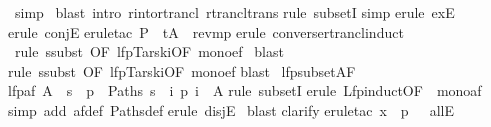\begin{isabellebody}
\ simp{\isacharparenright}\isanewline
\ blast\ intro{\isacharcolon}\ r{\isacharunderscore}into{\isacharunderscore}rtrancl\ rtrancl{\isacharunderscore}trans{\isacharparenright}\isanewline
{}rule\ subsetI{\isacharparenright}\isanewline
{}simp{\isacharparenright}\isanewline
{}erule\ exE{\isacharparenright}\isanewline
{}erule\ conjE{\isacharparenright}\isanewline
{}erule{\isacharunderscore}tac\ P\ {\isacharequal}\ {\isachardoublequote}t{\isasymin}A{\isachardoublequote}\ \ rev{\isacharunderscore}mp{\isacharparenright}\isanewline
{}erule\ converse{\isacharunderscore}rtrancl{\isacharunderscore}induct{\isacharparenright}\isanewline
\ rule\ ssubst\ {\isacharbrackleft}OF\ lfp{\isacharunderscore}Tarski{\isacharbrackleft}OF\ mono{\isacharunderscore}ef{\isacharbrackright}{\isacharbrackright}{\isacharparenright}\isanewline
\ blast{\isacharparenright}\isanewline
{}rule\ ssubst\ {\isacharbrackleft}OF\ lfp{\isacharunderscore}Tarski{\isacharbrackleft}OF\ mono{\isacharunderscore}ef{\isacharbrackright}{\isacharbrackright}{\isacharparenright}\isanewline
{}blast{\isacharparenright}\isanewline
\isanewline
{}\ lfp{\isacharunderscore}subset{\isacharunderscore}AF{\isacharcolon}\isanewline
{\isachardoublequote}lfp{\isacharparenleft}af\ A{\isacharparenright}\ {\isasymsubseteq}\ {\isacharbraceleft}s{\isachardot}\ {\isasymforall}\ p\ {\isasymin}\ Paths\ s{\isachardot}\ {\isasymexists}\ i{\isachardot}\ p\ i\ {\isasymin}\ A{\isacharbraceright}{\isachardoublequote}\isanewline
{}rule\ subsetI{\isacharparenright}\isanewline
{}erule\ Lfp{\isachardot}induct{\isacharbrackleft}OF\ {\isacharunderscore}\ mono{\isacharunderscore}af{\isacharbrackright}{\isacharparenright}\isanewline
{}simp\ add{\isacharcolon}\ af{\isacharunderscore}def\ Paths{\isacharunderscore}def{\isacharparenright}\isanewline
{}erule\ disjE{\isacharparenright}\isanewline
\ blast{\isacharparenright}\isanewline
{}clarify{\isacharparenright}\isanewline
{}erule{\isacharunderscore}tac\ x\ {\isacharequal}\ {\isachardoublequote}p\ \ \ allE{\isacharparenright}\isanewline

\end{isabellebody}
